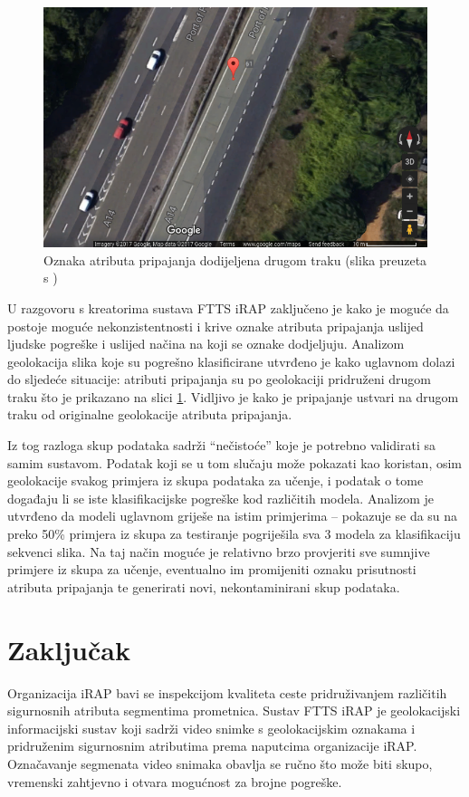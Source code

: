 \documentclass[times, utf8, diplomski, numeric]{fer}
\begin{document}
\begin{figure}[H]
\centering
\includegraphics[scale=0.5]{images/wrong_lane_label.png}
\caption{Oznaka atributa pripajanja dodijeljena drugom traku (slika preuzeta s \citep{url:google_maps})}
\label{img:wrong_lane_label}
\end{figure}

U razgovoru s kreatorima sustava FTTS iRAP zaključeno je kako je moguće da postoje moguće nekonzistentnosti i krive oznake atributa pripajanja uslijed ljudske pogreške i uslijed načina na koji se oznake dodjeljuju.
Analizom geolokacija slika koje su pogrešno klasificirane utvrđeno je kako uglavnom dolazi do sljedeće situacije: atributi pripajanja su po geolokaciji pridruženi drugom traku što je prikazano na slici \ref{img:wrong_lane_label}.
Vidljivo je kako je pripajanje ustvari na drugom traku od originalne geolokacije atributa pripajanja. 

Iz tog razloga skup podataka sadrži ``nečistoće'' koje je potrebno validirati sa samim sustavom. 
Podatak koji se u tom slučaju može pokazati kao koristan, osim geolokacije svakog primjera iz skupa podataka za učenje, i podatak o tome događaju li se iste klasifikacijske pogreške kod različitih modela.
Analizom je utvrđeno da modeli uglavnom griješe na istim primjerima -- pokazuje se da su na preko 50\% primjera iz skupa za testiranje pogriješila sva 3 modela za klasifikaciju sekvenci slika.
Na taj način moguće je relativno brzo provjeriti sve sumnjive primjere iz skupa za učenje, eventualno im promijeniti oznaku prisutnosti atributa pripajanja te generirati novi, nekontaminirani skup podataka.

\chapter{Zaključak}
Organizacija iRAP bavi se inspekcijom kvaliteta ceste pridruživanjem različitih sigurnosnih atributa segmentima prometnica. 
Sustav FTTS iRAP je geolokacijski informacijski sustav koji sadrži video snimke s geolokacijskim oznakama i pridruženim sigurnosnim atributima prema naputcima organizacije iRAP. 
Označavanje segmenata video snimaka obavlja se ručno što može biti skupo, vremenski zahtjevno i otvara mogućnost za brojne pogreške. 
\end{document}
